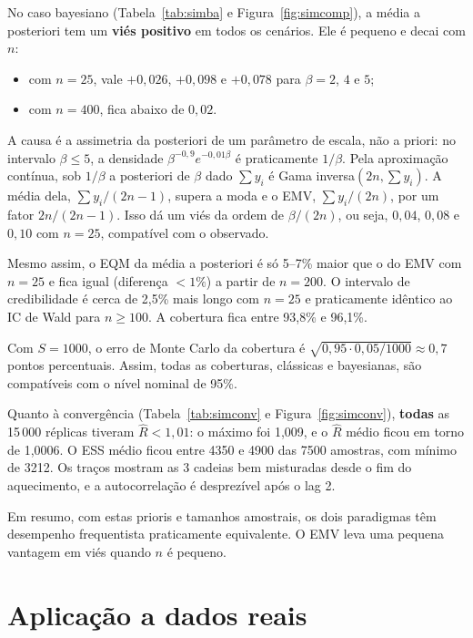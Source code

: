 \documentclass[11pt,a4paper]{article}
\begin{document}
No caso bayesiano (Tabela~\ref{tab:simba} e Figura~\ref{fig:simcomp}), a média a posteriori tem um \textbf{viés positivo} em todos os cenários. Ele é pequeno e decai com $n$:
\begin{itemize}
\item com $n=25$, vale $+0{,}026$, $+0{,}098$ e $+0{,}078$ para $\beta=2$, $4$ e $5$;
\item com $n=400$, fica abaixo de $0{,}02$.
\end{itemize}
A causa é a assimetria da posteriori de um parâmetro de escala, não a priori: no intervalo $\beta\le5$, a densidade $\beta^{-0{,}9}e^{-0{,}01\beta}$ é praticamente $1/\beta$. Pela aproximação contínua, sob $1/\beta$ a posteriori de $\beta$ dado $\sum y_i$ é Gama inversa$(2n,\sum y_i)$. A média dela, $\sum y_i/(2n-1)$, supera a moda e o EMV, $\sum y_i/(2n)$, por um fator $2n/(2n-1)$. Isso dá um viés da ordem de $\beta/(2n)$, ou seja, $0{,}04$, $0{,}08$ e $0{,}10$ com $n=25$, compatível com o observado.

Mesmo assim, o EQM da média a posteriori é só 5--7\% maior que o do EMV com $n=25$ e fica igual (diferença $<1\%$) a partir de $n=200$. O intervalo de credibilidade é cerca de 2,5\% mais longo com $n=25$ e praticamente idêntico ao IC de Wald para $n\ge100$. A cobertura fica entre 93,8\% e 96,1\%.

Com $S=1000$, o erro de Monte Carlo da cobertura é $\sqrt{0{,}95\cdot0{,}05/1000}\approx0{,}7$ pontos percentuais. Assim, todas as coberturas, clássicas e bayesianas, são compatíveis com o nível nominal de 95\%.

Quanto à convergência (Tabela~\ref{tab:simconv} e Figura~\ref{fig:simconv}), \textbf{todas} as 15\,000 réplicas tiveram $\hat R<1{,}01$: o máximo foi 1,009, e o $\hat R$ médio ficou em torno de 1,0006. O ESS médio ficou entre 4350 e 4900 das 7500 amostras, com mínimo de 3212. Os traços mostram as 3 cadeias bem misturadas desde o fim do aquecimento, e a autocorrelação é desprezível após o lag 2.

Em resumo, com estas prioris e tamanhos amostrais, os dois paradigmas têm desempenho frequentista praticamente equivalente. O EMV leva uma pequena vantagem em viés quando $n$ é pequeno.

\section{Aplicação a dados reais}
\end{document}
